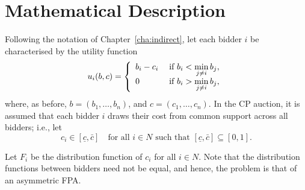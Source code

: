 \section{Mathematical Description} %
\label{sec:mathematical_description_approximation}

Following the notation of Chapter~\ref{cha:indirect}, let each bidder $i$ be characterised by the utility function
\begin{equation}
  \label{eq:utility_approximation}
    u_i(b,c) = \left\{
  \begin{array}{l l}
    b_i-c_i & \;\text{if } b_i < \displaystyle\min_{j\neq i}b_j,\\
    0 & \;\text{if } b_i > \displaystyle\min_{j\neq i}b_j,
  \end{array}\right.
\end{equation}
where, as before, $b = (b_1,\ldots,b_n)$, and $c = (c_1,\ldots,c_n)$. In the CP auction, it is assumed that each bidder $i$ draws their cost from common support across all bidders; i.e., let
\begin{equation}
  c_i\in [\underline{c}, \bar{c}] \quad\text{for all } i\in N \text{ such that } [\underline{c}, \bar{c}]\subseteq [0, 1].
\end{equation}

Let $F_i$ be the distribution function of $c_i$ for all $i\in N$. Note that the distribution functions between bidders need not be equal, and hence, the problem is that of an asymmetric FPA.

